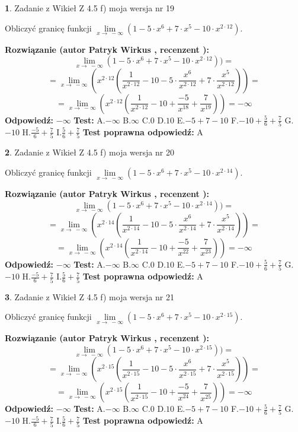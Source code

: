 \documentclass[12pt, a4paper]{article}
\theoremstyle{definition} %
\newtheorem{zad}{}
\newcommand{\zadStart}[1]{\begin{zad}#1\newline}
\newcommand{\zadStop}{\end{zad}}
\newcommand{\rozwStart}[2]{\noindent \textbf{Rozwiązanie (autor #1 , recenzent #2): }\newline}
\newcommand{\rozwStop}{\newline}
\newcommand{\odpStart}{\noindent \textbf{Odpowiedź:}\newline}
\newcommand{\odpStop}{\newline}
\newcommand{\testStart}{\noindent \textbf{Test:}\newline}
\newcommand{\testStop}{\newline}
\newcommand{\kluczStart}{\noindent \textbf{Test poprawna odpowiedź:}\newline}
\newcommand{\kluczStop}{\newline}
\begin{document}
\zadStart{Zadanie z Wikieł Z 4.5 f) moja wersja nr 19}



Obliczyć granicę funkcji  $\lim\limits_{x\to\ -\infty}(1 - 5 \cdot x^{6}+7 \cdot x^{5}- 10 \cdot x^{2\cdot12})$.
\zadStop
\rozwStart{Patryk Wirkus}{}
$$\lim\limits_{x\to\ -\infty}(1 - 5 \cdot x^{6}+7 \cdot x^{5}- 10 \cdot x^{2\cdot12}))=$$
$$=\lim\limits_{x\to\ -\infty}(x^{2\cdot12}(\frac{1}{x^{2\cdot12}}-10 -5 \cdot \frac{x^{6}}{x^{2\cdot12}}+7 \cdot \frac{x^{5}}{x^{2\cdot12}}))=$$
$$=\lim\limits_{x\to\ -\infty}(x^{2\cdot12}(\frac{1}{x^{2\cdot12}}-10 + \frac{-5}{x^{18}}+ \frac{7}{x^{19}}))=-\infty$$
\rozwStop
\odpStart
$-\infty$
\odpStop
\testStart
A.$-\infty$ B.$\infty$ C.$0$ D.$10$ E.$-5 + 7 - 10$
F.$-10+\frac{5}{6}+\frac{7}{5}$ G.$-10$
H.$\frac{-5}{6}+\frac{7}{5}$
I.$\frac{5}{6}+\frac{7}{5}$
\testStop
\kluczStart
A
\kluczStop



\zadStart{Zadanie z Wikieł Z 4.5 f) moja wersja nr 20}



Obliczyć granicę funkcji  $\lim\limits_{x\to\ -\infty}(1 - 5 \cdot x^{6}+7 \cdot x^{5}- 10 \cdot x^{2\cdot14})$.
\zadStop
\rozwStart{Patryk Wirkus}{}
$$\lim\limits_{x\to\ -\infty}(1 - 5 \cdot x^{6}+7 \cdot x^{5}- 10 \cdot x^{2\cdot14}))=$$
$$=\lim\limits_{x\to\ -\infty}(x^{2\cdot14}(\frac{1}{x^{2\cdot14}}-10 -5 \cdot \frac{x^{6}}{x^{2\cdot14}}+7 \cdot \frac{x^{5}}{x^{2\cdot14}}))=$$
$$=\lim\limits_{x\to\ -\infty}(x^{2\cdot14}(\frac{1}{x^{2\cdot14}}-10 + \frac{-5}{x^{22}}+ \frac{7}{x^{23}}))=-\infty$$
\rozwStop
\odpStart
$-\infty$
\odpStop
\testStart
A.$-\infty$ B.$\infty$ C.$0$ D.$10$ E.$-5 + 7 - 10$
F.$-10+\frac{5}{6}+\frac{7}{5}$ G.$-10$
H.$\frac{-5}{6}+\frac{7}{5}$
I.$\frac{5}{6}+\frac{7}{5}$
\testStop
\kluczStart
A
\kluczStop



\zadStart{Zadanie z Wikieł Z 4.5 f) moja wersja nr 21}



Obliczyć granicę funkcji  $\lim\limits_{x\to\ -\infty}(1 - 5 \cdot x^{6}+7 \cdot x^{5}- 10 \cdot x^{2\cdot15})$.
\zadStop
\rozwStart{Patryk Wirkus}{}
$$\lim\limits_{x\to\ -\infty}(1 - 5 \cdot x^{6}+7 \cdot x^{5}- 10 \cdot x^{2\cdot15}))=$$
$$=\lim\limits_{x\to\ -\infty}(x^{2\cdot15}(\frac{1}{x^{2\cdot15}}-10 -5 \cdot \frac{x^{6}}{x^{2\cdot15}}+7 \cdot \frac{x^{5}}{x^{2\cdot15}}))=$$
$$=\lim\limits_{x\to\ -\infty}(x^{2\cdot15}(\frac{1}{x^{2\cdot15}}-10 + \frac{-5}{x^{24}}+ \frac{7}{x^{25}}))=-\infty$$
\rozwStop
\odpStart
$-\infty$
\odpStop
\testStart
A.$-\infty$ B.$\infty$ C.$0$ D.$10$ E.$-5 + 7 - 10$
F.$-10+\frac{5}{6}+\frac{7}{5}$ G.$-10$
H.$\frac{-5}{6}+\frac{7}{5}$
I.$\frac{5}{6}+\frac{7}{5}$
\testStop
\kluczStart
A
\kluczStop
\end{document}
